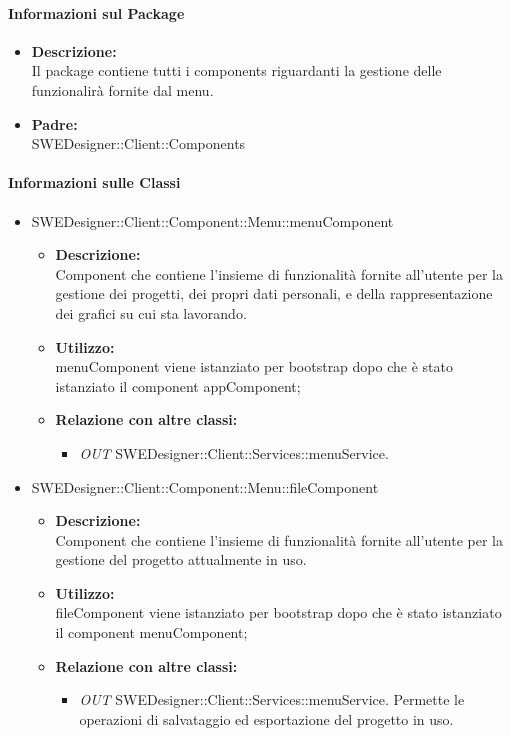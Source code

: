 \begin{itemize}
		\paragraph{Informazioni sul Package}
		\begin{itemize}
			\item \textbf{Descrizione: }\\
			Il package contiene tutti i components riguardanti la gestione delle funzionalirà fornite dal menu.
			\item \textbf{Padre: }\\ SWEDesigner::Client::Components
		\end{itemize}

		\paragraph{Informazioni sulle Classi}
		\begin{itemize}
		\item SWEDesigner::Client::Component::Menu::menuComponent		
		\begin{itemize}
			\item \textbf{Descrizione:}\\
			Component che contiene l'insieme di funzionalità fornite all'utente per la gestione dei progetti, dei propri dati personali, e della rappresentazione dei grafici su cui sta lavorando.
			\item \textbf{Utilizzo:}\\
			menuComponent viene istanziato per bootstrap dopo che è stato istanziato il component appComponent;
			\item \textbf{Relazione con altre classi:}\\
			\begin{itemize}
			\item \emph{OUT} SWEDesigner::Client::Services::menuService.
			\end{itemize}
		\end{itemize}
		
		\item SWEDesigner::Client::Component::Menu::fileComponent		
		\begin{itemize}
			\item \textbf{Descrizione:}\\
			Component che contiene l'insieme di funzionalità fornite all'utente per la gestione del progetto attualmente in uso.
			\item \textbf{Utilizzo:}\\
			fileComponent viene istanziato per bootstrap dopo che è stato istanziato il component menuComponent;
			\item \textbf{Relazione con altre classi:}\\
			\begin{itemize}
			\item \emph{OUT} SWEDesigner::Client::Services::menuService. Permette le operazioni di salvataggio ed esportazione del progetto in uso.
			\end{itemize}
		\end{itemize}
		

\end{itemize}
\end{itemize}
